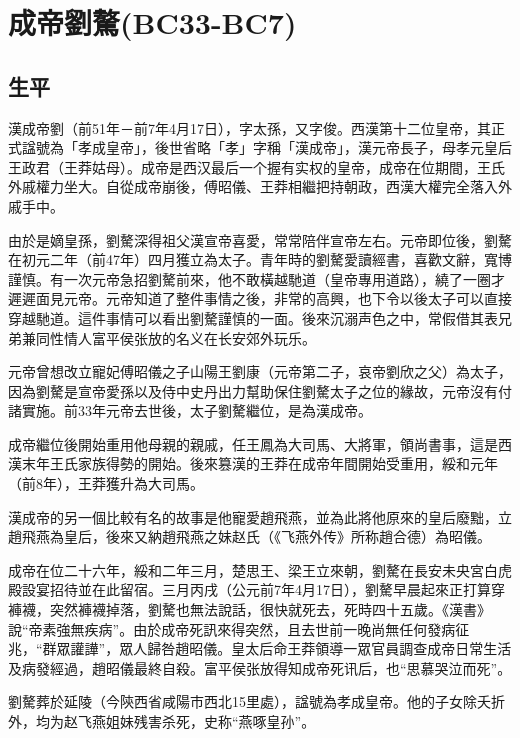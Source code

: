 
\section{成帝劉驁\tiny(BC33-BC7)}

\subsection{生平}

漢成帝劉（前51年－前7年4月17日），字太孫，又字俊。西漢第十二位皇帝，其正式諡號為「孝成皇帝」，後世省略「孝」字稱「漢成帝」，漢元帝長子，母孝元皇后王政君（王莽姑母）。成帝是西汉最后一个握有实权的皇帝，成帝在位期間，王氏外戚權力坐大。自從成帝崩後，傅昭儀、王莽相繼把持朝政，西漢大權完全落入外戚手中。

由於是嫡皇孫，劉驁深得祖父漢宣帝喜愛，常常陪伴宣帝左右。元帝即位後，劉驁在初元二年（前47年）四月獲立為太子。青年時的劉驁愛讀經書，喜歡文辭，寬博謹慎。有一次元帝急招劉驁前來，他不敢橫越馳道（皇帝專用道路），繞了一圈才遲遲面見元帝。元帝知道了整件事情之後，非常的高興，也下令以後太子可以直接穿越馳道。這件事情可以看出劉驁謹慎的一面。後來沉溺声色之中，常假借其表兄弟兼同性情人富平侯张放的名义在长安郊外玩乐。

元帝曾想改立寵妃傅昭儀之子山陽王劉康（元帝第二子，哀帝劉欣之父）為太子，因為劉驁是宣帝愛孫以及侍中史丹出力幫助保住劉驁太子之位的緣故，元帝沒有付諸實施。前33年元帝去世後，太子劉驁繼位，是為漢成帝。

成帝繼位後開始重用他母親的親戚，任王鳳為大司馬、大將軍，領尚書事，這是西漢末年王氏家族得勢的開始。後來篡漢的王莽在成帝年間開始受重用，綏和元年（前8年），王莽獲升為大司馬。

漢成帝的另一個比較有名的故事是他寵愛趙飛燕，並為此將他原來的皇后廢黜，立趙飛燕為皇后，後來又納趙飛燕之妹赵氏（《飞燕外传》所称趙合德）為昭儀。

成帝在位二十六年，綏和二年三月，楚思王、梁王立來朝，劉驁在長安未央宮白虎殿設宴招待並在此留宿。三月丙戌（公元前7年4月17日），劉驁早晨起來正打算穿褲襪，突然褲襪掉落，劉驁也無法說話，很快就死去，死時四十五歲。《漢書》說“帝素強無疾病”。由於成帝死訊來得突然，且去世前一晚尚無任何發病征兆，“群眾讙譁”，眾人歸咎趙昭儀。皇太后命王莽領導一眾官員調查成帝日常生活及病發經過，趙昭儀最終自殺。富平侯张放得知成帝死讯后，也“思慕哭泣而死”。

劉驁葬於延陵（今陝西省咸陽市西北15里處），諡號為孝成皇帝。他的子女除夭折外，均为赵飞燕姐妹残害杀死，史称“燕啄皇孙”。

